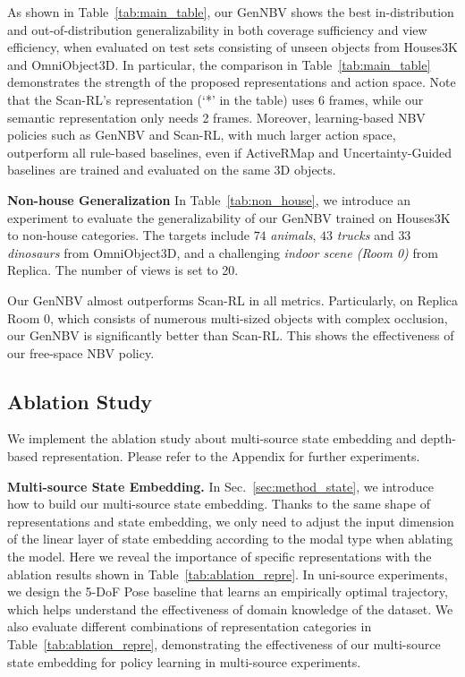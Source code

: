     As shown in Table~\ref{tab:main_table}, our GenNBV shows the best in-distribution and out-of-distribution generalizability in both coverage sufficiency and view efficiency, when evaluated on test sets consisting of unseen objects from Houses3K and OmniObject3D. In particular, the comparison in Table~\ref{tab:main_table} demonstrates the strength of the proposed representations and action space. Note that the Scan-RL's representation (`*' in the table) uses 6 frames, while our semantic representation only needs 2 frames.
    Moreover, learning-based NBV policies such as GenNBV and Scan-RL, with much larger action space, outperform all rule-based baselines, even if ActiveRMap and Uncertainty-Guided baselines are trained and evaluated on the same 3D objects.

    \noindent \textbf{Non-house Generalization} In Table~\ref{tab:non_house}, we introduce an experiment to evaluate the generalizability of our GenNBV trained on Houses3K to non-house categories. The targets include $74$ \textit{animals}, $43$ \textit{trucks} and $33$ \textit{dinosaurs} from OmniObject3D, and a challenging \textit{indoor scene (Room 0)} from Replica. The number of views is set to 20.

    Our GenNBV almost outperforms Scan-RL in all metrics. Particularly, on Replica Room 0, which consists of numerous multi-sized objects with complex occlusion, our GenNBV is significantly better than Scan-RL. This shows the effectiveness of our free-space NBV policy.

\subsection{Ablation Study}
    We implement the ablation study about multi-source state embedding and depth-based representation. Please refer to the Appendix for further experiments.
    
    \noindent\textbf{Multi-source State Embedding.}
    In Sec.~\ref{sec:method_state}, we introduce how to build our multi-source state embedding. Thanks to the same shape of representations and state embedding, we only need to adjust the input dimension of the linear layer of state embedding according to the modal type when ablating the model.
    Here we reveal the importance of specific representations with the ablation results shown in Table~\ref{tab:ablation_repre}. In uni-source experiments, we design the 5-DoF Pose baseline that learns an empirically optimal trajectory, which helps understand the effectiveness of domain knowledge of the dataset.
    We also evaluate different combinations of representation categories in Table~\ref{tab:ablation_repre}, demonstrating the effectiveness of our multi-source state embedding for policy learning in multi-source experiments.

